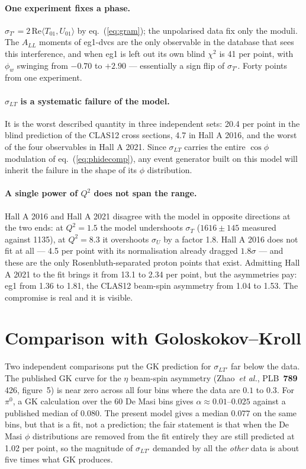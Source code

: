 \documentclass[11pt,a4paper]{article}
\newcommand{\sig}[1]{\sigma_{#1}}
\begin{document}
\paragraph{One experiment fixes a phase.}  $\sig{T'} = 2\,\mathrm{Re}\langle
T_{01}, U_{01}\rangle$ by eq.~(\ref{eq:gram}); the unpolarised data fix only the
moduli.  The $A_{LL}$ moments of eg1-dvcs are the only observable in the
database that sees this interference, and when eg1 is left out its own blind
$\chi^2$ is 41 per point, with $\phi_w$ swinging from $-0.70$ to $+2.90$ ---
essentially a sign flip of $\sig{T'}$.  Forty points from one experiment.

\paragraph{$\sig{LT}$ is a systematic failure of the model.}  It is the worst
described quantity in three independent sets: 20.4 per point in the blind
prediction of the CLAS12 cross sections, 4.7 in Hall A 2016, and the worst of
the four observables in Hall A 2021.  Since $\sig{LT}$ carries the entire
$\cos\phi$ modulation of eq.~(\ref{eq:phidecomp}), any event generator built on
this model will inherit the failure in the shape of its $\phi$ distribution.

\paragraph{A single power of $Q^2$ does not span the range.}  Hall A 2016 and
Hall A 2021 disagree with the model in opposite directions at the two ends: at
$Q^2 = 1.5$ the model undershoots $\sig{T}$ ($1616 \pm 145$ measured against
1135), at $Q^2 = 8.3$ it overshoots $\sig{U}$ by a factor 1.8.  Hall A 2016
does not fit at all --- 4.5 per point with its normalisation already dragged
$1.8\sigma$ --- and these are the only Rosenbluth-separated proton points that
exist.  Admitting Hall A 2021 to the fit brings it from 13.1 to 2.34 per point,
but the asymmetries pay: eg1 from 1.36 to 1.81, the CLAS12 beam-spin asymmetry
from 1.04 to 1.53.  The compromise is real and it is visible.

\section{Comparison with Goloskokov--Kroll}

Two independent comparisons put the GK prediction for $\sig{LT'}$ far below the
data.  The published GK curve for the $\eta$ beam-spin asymmetry
(Zhao~\textit{et al.}, PLB~\textbf{789} 426, figure~5) is near zero across all
four bins where the data are $0.1$ to $0.3$.  For $\pi^0$, a GK calculation over
the 60 De Masi bins gives $\alpha \approx 0.01$--$0.025$ against a published
median of $0.080$.  The present model gives a median $0.077$ on the same bins,
but that is a fit, not a prediction; the fair statement is that when the De Masi
$\phi$ distributions are removed from the fit entirely they are still predicted
at 1.02 per point, so the magnitude of $\sig{LT'}$ demanded by all the
\emph{other} data is about five times what GK produces.
\end{document}

